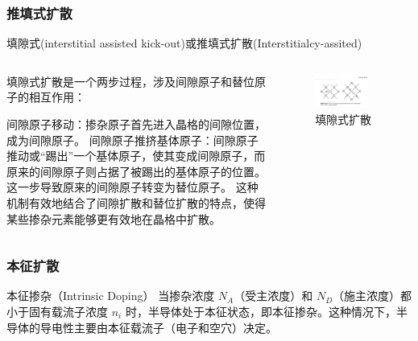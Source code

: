 \documentclass[xcolor=table,dvipsnames,svgnames,aspectratio=169]{ctexbeamer}
\begin{document}
\begin{frame}
  \frametitle{推填式扩散}

  填隙式(interstitial assisted kick-out)或推填式扩散(Interstitialcy-assited)
  \begin{columns}
    \begin{column}{0.7\textwidth}
      填隙式扩散是一个两步过程，涉及间隙原子和替位原子的相互作用：

      间隙原子移动：掺杂原子首先进入晶格的间隙位置，成为间隙原子。
      间隙原子推挤基体原子：间隙原子推动或“踢出”一个基体原子，使其变成间隙原子，而原来的间隙原子则占据了被踢出的基体原子的位置。这一步导致原来的间隙原子转变为替位原子。
      这种机制有效地结合了间隙扩散和替位扩散的特点，使得某些掺杂元素能够更有效地在晶格中扩散。
    \end{column}
    \begin{column}{0.3\textwidth}
      \begin{figure}
        \centering
        \includegraphics[width=0.8\textwidth]{填隙式扩散.png}
        \caption{填隙式扩散}
      \end{figure}
    \end{column}
  \end{columns}

\end{frame}

\begin{frame}
  \frametitle{本征扩散}

  \begin{block}{本征掺杂（Intrinsic Doping）}
    当掺杂浓度 \( N_A \)（受主浓度）和 \( N_D \)（施主浓度）都小于固有载流子浓度 \( n_i \) 时，半导体处于本征状态，即本征掺杂。这种情况下，半导体的导电性主要由本征载流子（电子和空穴）决定。
  \end{block}
\end{frame}
\end{document}
